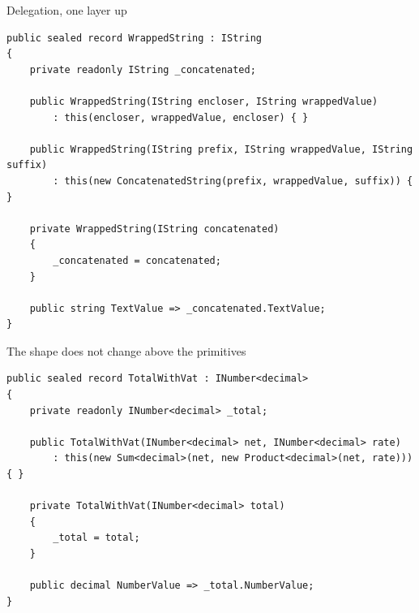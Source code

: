 \documentclass[aspectratio=169,10pt,t]{beamer}
\begin{document}
\begin{frame}[fragile]{Delegation, one layer up}
  \vspace{0.2em}
\begin{lstlisting}[basicstyle=\ttfamily\scriptsize]
public sealed record WrappedString : IString
{
    private readonly IString _concatenated;

    public WrappedString(IString encloser, IString wrappedValue)
        : this(encloser, wrappedValue, encloser) { }

    public WrappedString(IString prefix, IString wrappedValue, IString suffix)
        : this(new ConcatenatedString(prefix, wrappedValue, suffix)) { }

    private WrappedString(IString concatenated)
    {
        _concatenated = concatenated;
    }

    public string TextValue => _concatenated.TextValue;
}
\end{lstlisting}
  \vspace{0.4em}
\end{frame}

\begin{frame}[fragile]{The shape does not change above the primitives}
  \vspace{0.3em}
\begin{lstlisting}[basicstyle=\ttfamily\scriptsize]
public sealed record TotalWithVat : INumber<decimal>
{
    private readonly INumber<decimal> _total;

    public TotalWithVat(INumber<decimal> net, INumber<decimal> rate)
        : this(new Sum<decimal>(net, new Product<decimal>(net, rate))) { }

    private TotalWithVat(INumber<decimal> total)
    {
        _total = total;
    }

    public decimal NumberValue => _total.NumberValue;
}
\end{lstlisting}
  \vspace{0.6em}
\end{frame}
\end{document}
